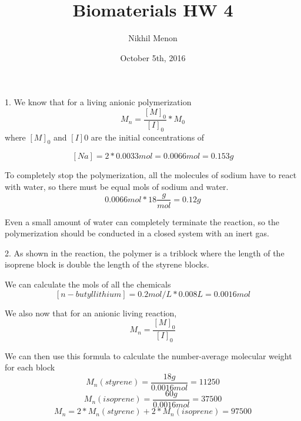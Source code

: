\documentclass{article}
\title{Biomaterials HW 4}
\author{Nikhil Menon}
\date{October 5th, 2016}
\begin{document}
\maketitle

1. We know that for a living anionic polymerization
$$M_n=\frac{[M]_0}{[I]_0}*M_0$$
where $[M]_0$ and $[I]0$ are the initial concentrations of 

$$[Na]=2*0.0033 mol = 0.0066 mol = 0.153 g$$

To completely stop the polymerization, all the molecules of sodium have to react with water, so there must be equal mols of sodium and water.
$$0.0066 mol * 18 \frac{g}{mol}=0.12 g$$

Even a small amount of water can completely terminate the reaction, so the polymerization should be conducted in a closed system with an inert gas.

2. As shown in the reaction, the polymer is a triblock where the length of the isoprene block is double the length of the styrene blocks.

We can calculate the mols of all the chemicals
$$[n-butyllithium]=0.2 mol/L*0.008 L =0.0016 mol$$

We also now that for an anionic living reaction,
$$M_n=\frac{[M]_0}{[I]_0}$$

We can then use this formula to calculate the number-average molecular weight for each block
$$M_n(styrene)=\frac{18 g}{0.0016 mol}=11250$$
$$M_n(isoprene)=\frac{60 g}{0.0016 mol}=37500$$
$$M_n=2*M_n(styrene)+2*M_n(isoprene)=97500$$
\end{document}
